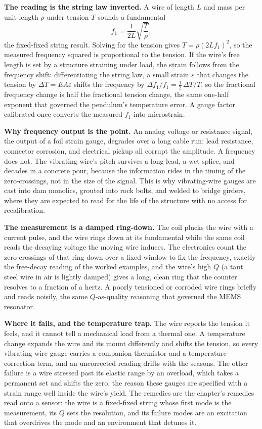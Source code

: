 \textbf{The reading is the string law inverted.} A wire of length $L$
and mass per unit length $\rho$ under tension $T$ sounds a fundamental
\[
f_1 = \frac{1}{2L}\sqrt{\frac{T}{\rho}},
\]
the fixed-fixed string result. Solving for the tension gives $T =
\rho(2Lf_1)^2$, so the measured frequency squared is proportional to the
tension. If the wire's free length is set by a structure straining
under load, the strain follows from the frequency shift: differentiating
the string law, a small strain $\varepsilon$ that changes the tension by
$\Delta T = EA\varepsilon$ shifts the frequency by $\Delta f_1/f_1 =
\tfrac12\,\Delta T/T$, so the fractional frequency change is half the
fractional tension change, the same one-half exponent that governed the
pendulum's temperature error. A gauge factor calibrated once converts
the measured $f_1$ into microstrain.

\textbf{Why frequency output is the point.} An analog voltage or
resistance signal, the output of a foil strain gauge, degrades over a
long cable run: lead resistance, connector corrosion, and electrical
pickup all corrupt the amplitude. A frequency does not. The vibrating
wire's pitch survives a long lead, a wet splice, and decades in a
concrete pour, because the information rides in the timing of the
zero-crossings, not in the size of the signal. This is why vibrating-wire
gauges are cast into dam monolics, grouted into rock bolts, and welded to
bridge girders, where they are expected to read for the life of the
structure with no access for recalibration.

\textbf{The measurement is a damped ring-down.} The coil plucks the wire
with a current pulse, and the wire rings down at its fundamental while
the same coil reads the decaying voltage the moving wire induces. The
electronics count the zero-crossings of that ring-down over a fixed
window to fix the frequency, exactly the free-decay reading of the
worked examples, and the wire's high $Q$ (a taut steel wire in air is
lightly damped) gives a long, clean ring that the counter resolves to a
fraction of a hertz. A poorly tensioned or corroded wire rings briefly
and reads noisily, the same $Q$-as-quality reasoning that governed the
MEMS resonator.

\textbf{Where it fails, and the temperature trap.} The wire reports the
tension it feels, and it cannot tell a mechanical load from a thermal
one. A temperature change expands the wire and its mount differently and
shifts the tension, so every vibrating-wire gauge carries a companion
thermistor and a temperature-correction term, and an uncorrected reading
drifts with the seasons. The other failure is a wire stressed past its
elastic range by an overload, which takes a permanent set and shifts the
zero, the reason these gauges are specified with a strain range well
inside the wire's yield. The remedies are the chapter's remedies read
onto a sensor: the wire is a fixed-fixed string whose first mode is the
measurement, its $Q$ sets the resolution, and its failure modes are an
excitation that overdrives the mode and an environment that detunes it.

